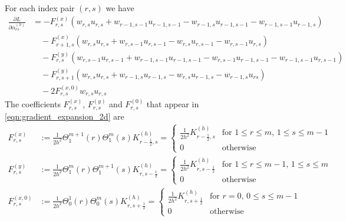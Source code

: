 \documentclass[11pt]{article}
\begin{document}
For each index pair $(r,s)$ we have
\begin{equation}
    \begin{aligned}
    \frac{\partial L}{\partial\alpha^{(h)}_{rs}}
    &= - F^{(x)}_{r,s}\left(w_{r,s}u_{r,s}+w_{r-1,s-1}u_{r-1,s-1}-w_{r-1,s}u_{r-1,s-1}-w_{r-1,s-1}u_{r-1,s}\right)\\
    &\quad - F^{(x)}_{r+1,s}\left(w_{r,s}u_{r,s}+w_{r,s-1}u_{r,s-1}-w_{r,s}u_{r,s-1}-w_{r,s-1}u_{r,s}\right)\\
    &\quad -F^{(y)}_{r,s}\left(w_{r,s-1}u_{r,s-1}+w_{r-1,s-1}u_{r-1,s-1}-w_{r,s-1}u_{r-1,s-1}-w_{r-1,s-1}u_{r,s-1}\right)\\
     &\quad - F^{(y)}_{r,s+1}\left(w_{r,s}u_{r,s}+w_{r-1,s}u_{r-1,s}-w_{r,s}u_{r-1,s}-w_{r-1,s}u_{rs}\right)\\
    &\quad - 2F^{(x,0)}_{r,s}w_{r,s}u_{r,s}
    \end{aligned}\label{eqn:gradient_expansion_2d}
\end{equation}
The coefficients $F^{(x)}_{r,s}$, $F^{(y)}_{r,s}$ and $F^{(0)}_{r,s}$ that appear in \eqref{eqn:gradient_expansion_2d} are
\begin{equation}
    \begin{aligned}
        F^{(x)}_{r,s} &:= \frac{1}{2h^2}\Theta_1^{m+1}(r)\Theta_1^{m}(s)K^{(h)}_{r-\frac{1}{2},s}
        =\begin{cases}
            \frac{1}{2h^2}K^{(h)}_{r-\frac{1}{2},s} & \text{for $1\le r\le m$, $1\le s\le m-1$}\\
            0 & \text{otherwise}
        \end{cases}\\
        F^{(y)}_{r,s} &:= \frac{1}{2h^2}\Theta_1^{m}(r)\Theta_1^{m+1}(s)K^{(h)}_{r,s-\frac{1}{2}}=\begin{cases}
            \frac{1}{2h^2}K^{(h)}_{r,s-\frac{1}{2}} & \text{for $1\le r\le m-1$, $1\le s\le m$}\\
            0 & \text{otherwise}
        \end{cases}\\
        F^{(x,0)}_{r,s} &:= \frac{1}{2h^2}\Theta_0^1(r)\Theta_0^m(s)K^{(h)}_{r,s+\frac{1}{2}}=\begin{cases}
            \frac{1}{2h^2}K^{(h)}_{r,s+\frac{1}{2}} & \text{for $r=0$, $0\le s\le m-1$}\\
            0 & \text{otherwise}
        \end{cases}
    \end{aligned}
\end{equation}
\end{document}
